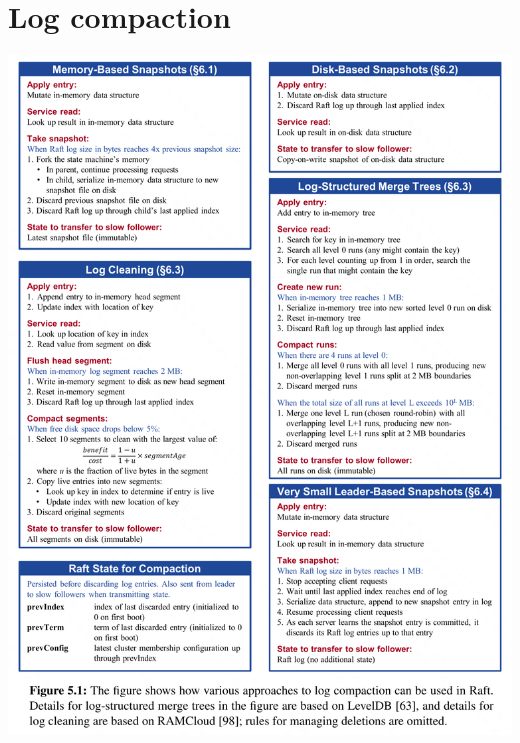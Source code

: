 \documentclass[11pt]{article}
\begin{document}
\section{Log compaction}
\label{sec:orgcb769c6}
\begin{center}
\includegraphics[width=.99\textwidth]{../../images/papers/23.png}
\label{}
\end{center}
\end{document}
